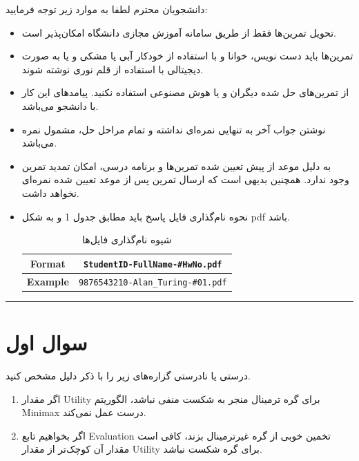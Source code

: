 \documentclass[a4paper,10pt]{article}
\begin{document}
	دانشجویان محترم لطفا به موارد زیر توجه فرمایید:
	\begin{itemize}
		\itemsep0em
		\item
		تحويل تمرين‌ها فقط از طريق سامانه  آموزش مجازی دانشگاه امکان‌‌پذیر است.
		\item 
		تمرین‌ها باید دست نویس، خوانا و با استفاده از خودکار آبی یا مشکی و یا به صورت دیجیتالی با استفاده از قلم نوری نوشته شوند. 
		\item
		از تمرین‌های حل شده دیگران و یا هوش مصنوعی استفاده نکنید. پیامد‌های این کار با دانشجو می‌باشد. 
		\item
		نوشتن جواب آخر به تنهايى نمره‌ای نداشته و تمام مراحل حل، مشمول نمره می‌باشد.
		\item 
		به دلیل موعد از پیش تعیین شده تمرین‌ها و برنامه درسی، امکان تمدید تمرین وجود ندارد. همچنین بدیهی است که ارسال تمرین پس از موعد تعیین شده نمره‌ای نخواهد داشت.
		
		\item نحوه نام‌گذاری فایل پاسخ باید مطابق جدول 1
		و به شکل pdf باشد.
		
		\begin{table}[h]
			\centering
			\begin{tabular}{|c|c|}
				\hline
				\textbf{Format} & \texttt{StudentID-FullName-\#HwNo.pdf} \\
				\hline
				\textbf{Example} & \texttt{9876543210-Alan\_Turing-\#01.pdf} \\
				\hline
			\end{tabular}
			\caption{شیوه نام‌گذاری فایل‌ها}
			\label{tab:file_format}
		\end{table}
		
		
	\end{itemize}
	\rule{\linewidth}{0.4pt}
	
	
	
	\section{سوال اول}
	
	درستی یا نادرستی گزاره‌های زیر را با ذکر دلیل مشخص کنید.
	
	\begin{enumerate}[label=\alph*)]
		\item اگر مقدار Utility برای گره ترمینال منجر به شکست منفی نباشد، الگوریتم Minimax درست عمل نمی‌کند.
		
		\item اگر بخواهیم تابع Evaluation تخمین خوبی از گره غیرترمینال بزند، کافی است مقدار آن کوچک‌تر از مقدار Utility برای گره شکست نباشد.
	\end{enumerate}
	
\end{document}

